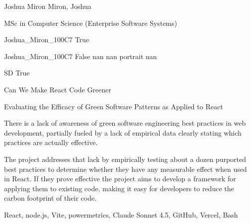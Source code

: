 \documentclass[twoside]{report}
\begin{document}
\begingroup{}\relax



\def\Key{Joshua_Miron_100C7}

{Joshua Miron}
{Miron, Joshua}

{MSc in Computer Science (Enterprise Software Systems)}

{Joshua_Miron_100C7}
{True}

{Joshua_Miron_100C7}
{False}
{nan}
{nan}
{portrait}
{nan}

{SD}
{True}

{Can We Make React Code Greener}

{Evaluating the Efficacy of Green Software Patterns as Applied to React}

{There is a lack of awareness of green software engineering best practices in web development, partially fueled by a lack of empirical data clearly stating which practices are actually effective.

The project addresses that lack by empirically testing about a dozen purported best practices to determine whether they have any measurable effect when used in React. If they prove effective the project aims to develop a framework for applying them to existing code, making it easy for developers to reduce the carbon footprint of their code.}

{React, node.js, Vite, powermetrics, Claude Sonnet 4.5, GitHub, Vercel, Bash}
\end{document}
